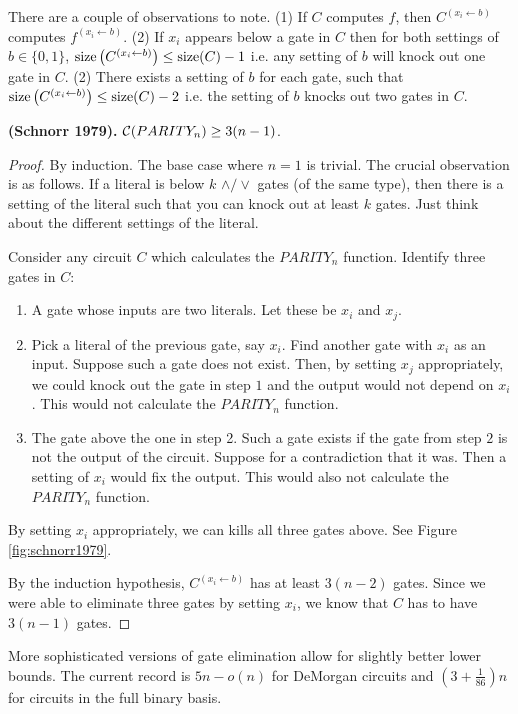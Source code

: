 \documentclass[11pt]{article}
\begin{document}
	There are a couple of observations to note. (1) If $C$ computes $f$, then $C^{(x_i \leftarrow b)}$ computes $f^{(x_i \leftarrow b)}$. (2) If $x_i$ appears below a gate in $C$ then for both settings of $b \in \{0,1\}$, $\operatorname*{size}\left(C^{(x_i \leftarrow b)}\right) \leq \operatorname*{size}(C) - 1$ i.e. any setting of $b$ will knock out one gate in $C$. (2) There exists a setting of $b$ for each gate, such that $\operatorname*{size}\left(C^{(x_i \leftarrow b)}\right) \leq \operatorname*{size}(C) - 2$ i.e. the setting of $b$ knocks out two gates in $C$.
	
	\begin{theorem}
		\label{thm:schnorr1979-XORlb}
		\textbf{(Schnorr 1979).} $\mathcal{C}(PARITY_n) \geq 3(n-1)$.
	\end{theorem}
	\begin{proof}
		By induction. The base case where $n = 1$ is trivial. The crucial observation is as follows. If a literal is below $k$ $\land/\lor$ gates (of the same type), then there is a setting of the literal such that you can knock out at least $k$ gates. Just think about the different settings of the literal.
		
		Consider any circuit $C$ which calculates the $PARITY_n$ function. Identify three gates in $C$:
		\begin{enumerate}
			\item A gate whose inputs are two literals. Let these be $x_i$ and $x_j$. 
			\item Pick a literal of the previous gate, say $x_i$. Find another gate with $x_i$ as an input. Suppose such a gate does not exist. Then, by setting $x_j$ appropriately, we could knock out the gate in step $1$ and the output would not depend on $x_i$. This would not calculate the $PARITY_n$ function.
			\item The gate above the one in step 2. Such a gate exists if the gate from step $2$ is not the output of the circuit. Suppose for a contradiction that it was. Then a setting of $x_i$ would fix the output. This would also not calculate the $PARITY_n$ function.
		\end{enumerate}  
		By setting $x_i$ appropriately, we can kills all three gates above. See Figure \ref{fig:schnorr1979}.
		
		
		By the induction hypothesis, $C^{(x_i \leftarrow b)}$ has at least $3(n - 2)$ gates. Since we were able to eliminate three gates by setting $x_i$, we know that $C$ has to have $3(n-1)$ gates.  
	\end{proof}
	More sophisticated versions of gate elimination allow for slightly better lower bounds. The current record is $5n - o(n)$ for DeMorgan circuits and $\left(3 + \frac{1}{86}\right)n$ for circuits in the full binary basis. 
\end{document}
